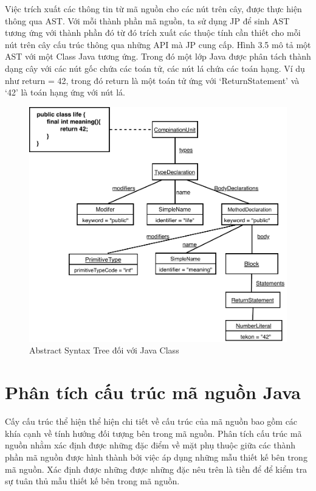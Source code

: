 \documentclass[12pt]{report}
\begin{document}
\noindent Việc trích xuất các thông tin từ mã nguồn cho các nút trên cây, được thực hiện thông qua AST. Với mỗi thành phần mã nguồn, ta sử dụng JP để sinh AST tương ứng với thành phần đó từ đó trích xuất các thuộc tính cần thiết cho mỗi nút trên cây cấu trúc thông qua những API mà JP cung cấp.
Hình 3.5 mô tả một AST với một Class Java tương ứng. Trong đó một lớp Java được phân tách thành dạng cây với các nút gốc chứa các toán tử, các nút lá chứa các toán hạng. Ví dụ như return = 42, trong đó return là một toán tử ứng với `ReturnStatement' và `42' là toán hạng ứng với nút lá.
\begin{figure}[!htbp]
	\vspace{1cm}
	\centering
	\includegraphics[scale=1]{images/ast_pdf_}
	\caption{Abstract Syntax Tree đối với Java Class}
	\label{fig:ast_for_java_class}
\end{figure}
\newpage
\section{Phân tích cấu trúc mã nguồn Java}
\indent Cấy cấu trúc thể hiện thể hiện chi tiết về cấu trúc của mã nguồn bao gồm các khía cạnh về tính hướng đối tượng bên trong mã nguồn. Phân tích cấu trúc mã nguồn nhằm xác định được những đặc điểm về mặt phụ thuộc giữa các thành phần mã nguồn được hình thành bởi việc áp dụng những mẫu thiết kế bên trong mã nguồn. Xác định được những được những đặc nêu trên là tiền để để kiểm tra sự tuân thủ mẫu thiết kế bên trong mã nguồn.
\end{document}

